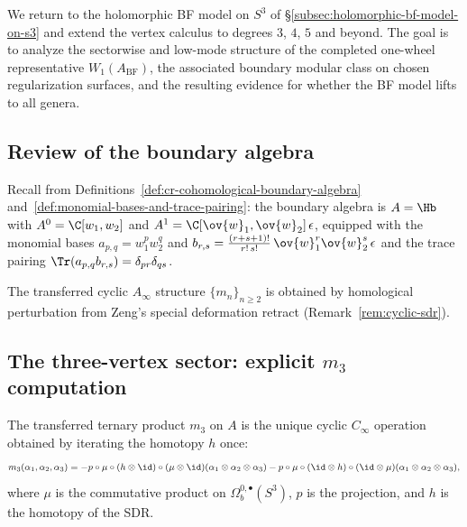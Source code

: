 We return to the holomorphic BF model on $S^3$ of
\S\ref{subsec:holomorphic-bf-model-on-s3} and extend the vertex
calculus to degrees $3$, $4$, $5$ and beyond. The goal is to
analyze the sectorwise and low-mode structure of the completed one-wheel
representative $W_1(A_{\mathrm{BF}})$, the associated boundary modular class
on chosen regularization surfaces, and the resulting evidence for whether the
BF model lifts to all genera.

\subsection{Review of the boundary algebra}

Recall from Definitions~\ref{def:cr-cohomological-boundary-algebra}
and~\ref{def:monomial-bases-and-trace-pairing}: the boundary algebra is
$A = \Hb$ with $A^0 = \C[w_1, w_2]$ and
$A^1 = \C[\ov{w}_1, \ov{w}_2]\,\epsilon$, equipped with the monomial bases
$a_{p,q} = w_1^p w_2^q$ and $b_{r,s} = \frac{(r+s+1)!}{r!\,s!}\,
\ov{w}_1^r \ov{w}_2^s\,\epsilon$ and the trace pairing
$\Tr(a_{p,q} b_{r,s}) = \delta_{pr} \delta_{qs}$.

The transferred cyclic $A_\infty$ structure $\{m_n\}_{n \geq 2}$ is obtained
by homological perturbation from Zeng's special deformation retract
(Remark~\ref{rem:cyclic-sdr}).

\subsection{The three-vertex sector: explicit $m_3$ computation}

\begin{theorem}
The transferred ternary product $m_3$ on $A$ is the unique cyclic $C_\infty$
operation obtained by iterating the homotopy $h$ once:
\begin{equation}
m_3(\alpha_1, \alpha_2, \alpha_3)
= -p \circ \mu \circ (h \otimes \id) \circ (\mu \otimes \id)(\alpha_1 \otimes \alpha_2 \otimes \alpha_3)
- p \circ \mu \circ (\id \otimes h) \circ (\id \otimes \mu)(\alpha_1 \otimes \alpha_2 \otimes \alpha_3),
\end{equation}
where $\mu$ is the commutative product on $\Omega_b^{0,\bullet}(S^3)$, $p$ is the
projection, and $h$ is the homotopy of the SDR.
\end{theorem}

